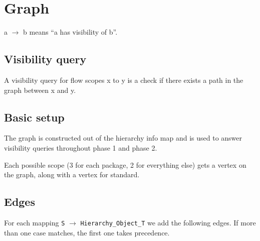 \documentclass{article}
\begin{document}
\section{Graph}
a $\rightarrow$ b means ``a has visibility of b''.

\subsection{Visibility query}
A visibility query for flow scopes x to y is a check if there exists a path
in the graph between x and y.

\subsection{Basic setup}
The graph is constructed out of the hierarchy info map and is used to
answer visibility queries throughout phase 1 and phase 2.

Each possible scope (3 for each package, 2 for everything else) gets a
vertex on the graph, along with a vertex for standard.

\pagebreak
\subsection{Edges}
For each mapping \verb|S| $\rightarrow$ \verb|Hierarchy_Object_T| we add
the following edges. If more than one case matches, the first one takes
precedence.
\end{document}
